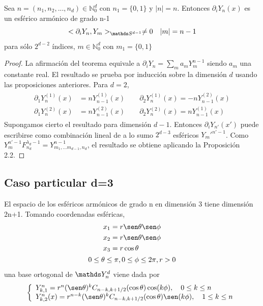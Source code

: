 \begin{thm}
	Sea $n=(n_1,n_2,...,n_d)\in\mathds{N}_0^d$ con $n_1=\{0,1\}$ y $|n|=n$. Entonces
	$\partial_i Y_n(x)$ es un esférico armónico de grado n-1 $$
	<\partial_i Y_n,Y_m>_{\sphere} \neq 0 \quad |m|=n-1$$
	para sólo $2^{d-2}$ índices, $m\in\mathds{N}_0^d$ con $m_1=\{0,1\}$
\end{thm}
\begin{proof}
La afirmación del teorema equivale a $\partial_i Y_n = \sum_{m} a_mY_m^{n-1}$ siendo $a_m$ una constante real. El resultado se prueba por inducción sobre la dimensión $d$ usando las proposiciones anteriores.
Para $d=2$, 
\begin{gather*}
\begin{aligned}
\partial_1 Y_n^{(1)}(x) &= nY_{n-1}^{(1)}(x) \qquad \partial_2 Y_n^{(1)}(x) = -nY_{n-1}^{(2)}(x)
\\ \partial_1 Y_n^{(2)}(x) &= nY_{n-1}^{(2)}(x) \qquad \partial_2 Y_n^{(2)}(x) = nY_{n-1}^{(1)}(x)
\end{aligned}
\end{gather*}
Supongamos cierto el resultado para dimensión $d-1$. Entonces $\partial_i Y_{n'}(x')$ puede escribirse como combinación lineal de a lo sumo $2^{d-3}$ esféricos $Y_m'^{n'-1}$. Como $Y_m^{n'-1}F_{n_d}^{\lambda_d-1} = Y_{m_1,...m_{d-1},n_d}^{n-1}$, el resultado se obtiene aplicando la Proposición 2.2.
\end{proof}
\subsection{Caso particular d=3}
El espacio de los esféricos armónicos de grado n en dimensión 3 tiene dimensión 2n+1. Tomando coordenadas esféricas,
\begin{gather*}
\begin{aligned}
x_1 &= r \sen \theta \sen \phi\\
x_2 &= r \sen \theta \sen \phi\\
x_3 &= r \cos \theta\\
\end{aligned}
\\
0\le \theta \le \pi,0\le\phi\le2\pi,r>0
\end{gather*}
una base ortogonal de $\spharm$ viene dada por
\begin{equation}
	\left\lbrace
	\begin{array}{ll}
	Y^n_ {k,1} = r^n(\sen \theta)^kC_{n-k,k+1/2}(\cos \theta) \cos(k\phi),\quad 0\le k\le n \\
	Y^n_{k,2}(x) = r^{n-k}(\sen\theta)^kC_{n-k,k+1/2}(\cos\theta)\sen(k\phi), \quad 1\le k\le n
	\end{array}
	\right.
\end{equation}

